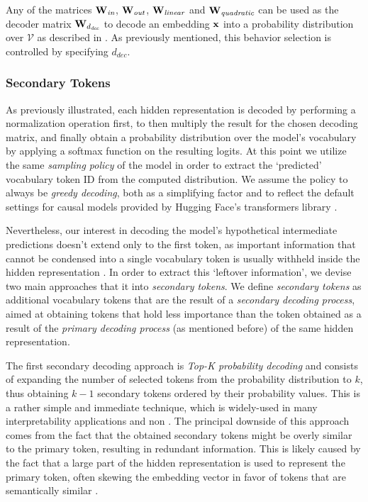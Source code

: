 Any of the matrices $\bm{\mathbf{W}}_\textit{in}$, $\bm{\mathbf{W}}_\textit{out}$, $\bm{\mathbf{W}}_\textit{linear}$ and $\bm{\mathbf{W}}_\textit{quadratic}$ can be used as the decoder matrix $\bm{\mathbf{W}}_{d_\textit{dec}}$ to decode an embedding $\bm{\mathbf{x}}$ into a probability distribution over $\mathcal{V}$ as described in .
As previously mentioned, this behavior selection is controlled by specifying $d_\textit{dec}$.

\subsubsection{Secondary Tokens}
    
As previously illustrated, each hidden representation is decoded by performing a normalization operation first, to then multiply the result for the chosen decoding matrix, and finally obtain a probability distribution over the model's vocabulary by applying a softmax function on the resulting logits.
At this point we utilize the same \emph{sampling policy} of the model in order to extract the `predicted' vocabulary token ID from the computed distribution.
We assume the policy to always be \emph{greedy decoding}, both as a simplifying factor and to reflect the default settings for causal models provided by Hugging Face's transformers library .

Nevertheless, our interest in decoding the model's hypothetical intermediate predictions doesn't extend only to the first token, as important information that cannot be condensed into a single vocabulary token is usually withheld inside the hidden representation .
In order to extract this `leftover information', we devise two main approaches that  it into \emph{secondary tokens}.
We define \emph{secondary tokens} as additional vocabulary tokens that are the result of a \emph{secondary decoding process}, aimed at obtaining tokens that hold less importance than the token obtained as a result of the \emph{primary decoding process} (as mentioned before) of the same hidden representation.

The first secondary decoding approach is \emph{Top-K probability decoding} and consists of expanding the number of selected tokens from the probability distribution to $k$, thus obtaining $k-1$ secondary tokens ordered by their probability values.
This is a rather simple and immediate technique, which is widely-used in many interpretability applications and non .
The principal downside of this approach comes from the fact that the obtained secondary tokens might be overly similar to the primary token, resulting in redundant information.
This is likely caused by the fact that a large part of the hidden representation is used to represent the primary token, often skewing the embedding vector in favor of tokens that are semantically similar .

